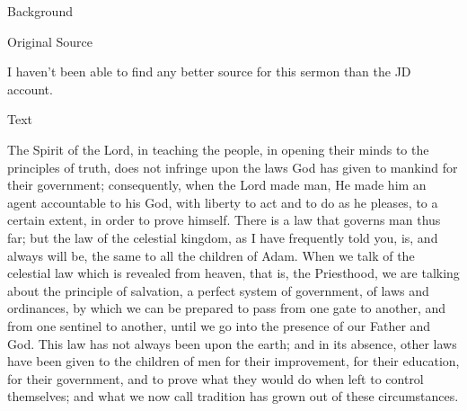 				\begin{description}
					\item[Background]
				\end{description}
				
					\phantom{.}
				
				\begin{description}
					\item[Original Source]
				\end{description}
				
					I haven't been able to find any better source for this sermon than the JD account.
				
				\begin{description}
					\item[Text]
				\end{description}
				
					The Spirit of the Lord, in teaching the people, in opening their minds to the principles of truth, does not infringe upon the laws God has given to mankind for their government; consequently, when the Lord made man, He made him an agent accountable to his God, with liberty to act and to do as he pleases, to a certain extent, in order to prove himself. There is a law that governs man thus far; but the law of the celestial kingdom, as I have frequently told you, is, and always will be, the same to all the children of Adam. When we talk of the celestial law which is revealed from heaven, that is, the Priesthood, we are talking about the principle of salvation, a perfect system of government, of laws and ordinances, by which we can be prepared to pass from one gate to another, and from one sentinel to another, until we go into the presence of our Father and God. This law has not always been upon the earth; and in its absence, other laws have been given to the children of men for their improvement, for their education, for their government, and to prove what they would do when left to control themselves; and what we now call tradition has grown out of these circumstances.
		
